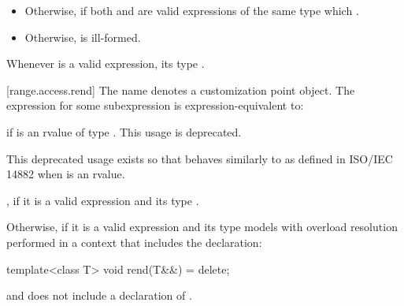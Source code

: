 {\begin{itemize}
\item
  Otherwise,  if both
   and  are valid expressions of the same
  type  which  
  .

\item
  Otherwise,  is ill-formed.
\end{itemize}

\pnum
\begin{note}
Whenever  is a valid expression, its
type   .
\end{note}

[range.access.rend]{}
\pnum
The name  denotes a customization point
object. The expression
 for some subexpression  is expression-equivalent to:

\begin{itemize}
{\color{oldclr}
\item
   if  is an rvalue of
  type . This usage is deprecated.
  \begin{note}
  This deprecated usage exists so that
   behaves similarly to 
  as defined in ISO/IEC 14882 when  is an rvalue.
  \end{note}
} %

\item
   ,
   if it is a valid expression and its
  type   
  .

{\color{newclr}
\item
  Otherwise,  if it is a valid expression and
  its type  models  with
  overload resolution performed in a context that includes the declaration:
  \begin{codeblock}
  template<class T> void rend(T&&) = delete;
  \end{codeblock}
  and does not include a declaration of .
} %


\end{itemize}}
